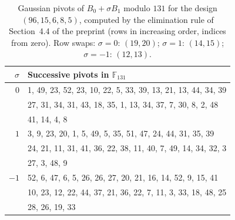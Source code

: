 \begin{table}[ht]
\centering
\small
\begin{tabular}{rl}
\hline
$\sigma$ & Successive pivots in $\mathbb{F}_{131}$ \\
\hline
$0$ & 1, 49, 23, 52, 23, 10, 22, 5, 33, 39, 13, 21, 13, 44, 34, 39 \\
 & 27, 31, 34, 31, 43, 18, 35, 1, 13, 34, 37, 7, 30, 8, 2, 48 \\
 & 41, 14, 4, 8 \\
\hline
$1$ & 3, 9, 23, 20, 1, 5, 49, 5, 35, 51, 47, 24, 44, 31, 35, 39 \\
 & 24, 21, 11, 31, 41, 36, 22, 38, 11, 40, 7, 49, 14, 34, 32, 3 \\
 & 27, 3, 48, 9 \\
\hline
$-1$ & 52, 6, 47, 6, 5, 26, 26, 27, 20, 21, 16, 14, 52, 9, 15, 41 \\
 & 10, 23, 12, 22, 44, 37, 21, 36, 22, 7, 11, 3, 33, 18, 48, 25 \\
 & 28, 26, 19, 33 \\
\hline
\end{tabular}
\caption{Gaussian pivots of $B_0+\sigma B_1$ modulo $131$ for the design $(96,15,6,8,5)$, computed by the elimination rule of Section~4.4 of the preprint (rows in increasing order, indices from zero). Row swaps: $\sigma=0$: $(19,20)$; $\sigma=1$: $(14,15)$; $\sigma=-1$: $(12,13)$.}
\label{tab:pivots131}
\end{table}
